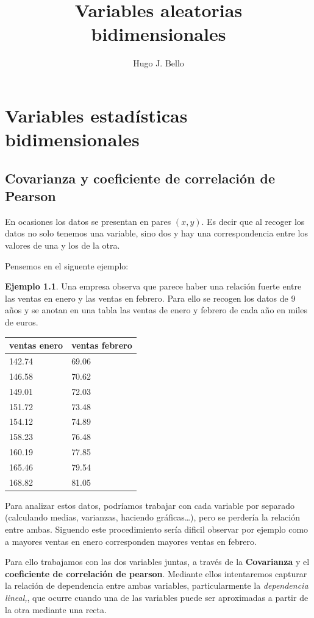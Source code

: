 \documentclass[]{book}
\title{Variables aleatorias bidimensionales}
\author{Hugo J. Bello}
\date{}
\theoremstyle{plain}
\theoremstyle{definition}
\newtheorem{example}[theorem]{Ejemplo}
\begin{document}
\chapter{Variables estadísticas bidimensionales}

\section{Covarianza y coeficiente de correlación de Pearson}

En ocasiones los datos se presentan en pares \((x,y)\). Es decir que al
recoger los datos no solo tenemos una variable, sino dos y hay una
correspondencia entre los valores de una y los de la otra.

Pensemos en el siguente ejemplo:

\begin{example}
  
Una empresa observa que parece haber una relación fuerte entre las
ventas en enero y las ventas en febrero. Para ello se recogen los datos
de 9 años y se anotan en una tabla las ventas de enero y febrero de cada
año en miles de euros.

\begin{longtable}[]{@{}ll@{}}
\toprule
ventas enero & ventas febrero\tabularnewline
\midrule
\endhead
142.74 & 69.06\tabularnewline
146.58 & 70.62\tabularnewline
149.01 & 72.03\tabularnewline
151.72 & 73.48\tabularnewline
154.12 & 74.89\tabularnewline
158.23 & 76.48\tabularnewline
160.19 & 77.85\tabularnewline
165.46 & 79.54\tabularnewline
168.82 & 81.05\tabularnewline
\bottomrule
\end{longtable}

Para analizar estos datos, podríamos trabajar con cada variable por
separado (calculando medias, varianzas, haciendo gráficas\ldots{}), pero
se perdería la relación entre ambas. Siguendo este procedimiento sería
dificil observar por ejemplo como a mayores ventas en enero corresponden
mayores ventas en febrero.

Para ello trabajamos con las dos variables juntas, a través de la
\textbf{Covarianza} y el \textbf{coeficiente de correlación de pearson}.
Mediante ellos intentaremos capturar la relación de dependencia entre
ambas variables, particularmente la \emph{dependencia lineal,}, que
ocurre cuando una de las variables puede ser aproximadas a partir de la
otra mediante una recta.
\end{example}
\end{document}
